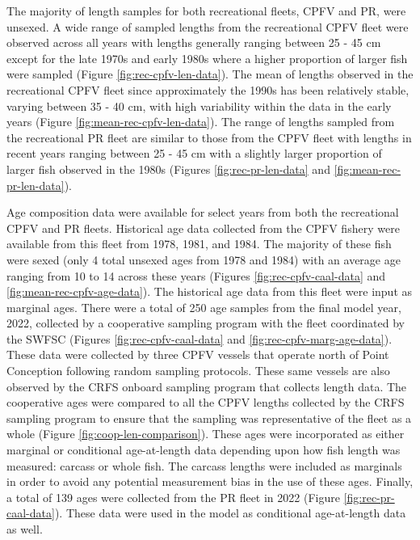\documentclass[11pt,
  english,
  letterpaper,
]{article}
\begin{document}
The majority of length samples for both recreational fleets, CPFV and PR, were unsexed. A wide range of sampled lengths from the recreational CPFV fleet were observed across all years with lengths generally ranging between 25 - 45 cm except for the late 1970s and early 1980s where a higher proportion of larger fish were sampled (Figure \ref{fig:rec-cpfv-len-data}). The mean of lengths observed in the recreational CPFV fleet since approximately the 1990s has been relatively stable, varying between 35 - 40 cm, with high variability within the data in the early years (Figure \ref{fig:mean-rec-cpfv-len-data}). The range of lengths sampled from the recreational PR fleet are similar to those from the CPFV fleet with lengths in recent years ranging between 25 - 45 cm with a slightly larger proportion of larger fish observed in the 1980s (Figures \ref{fig:rec-pr-len-data} and \ref{fig:mean-rec-pr-len-data}).

Age composition data were available for select years from both the recreational CPFV and PR fleets. Historical age data collected from the CPFV fishery were available from this fleet from 1978, 1981, and 1984. The majority of these fish were sexed (only 4 total unsexed ages from 1978 and 1984) with an average age ranging from 10 to 14 across these years (Figures \ref{fig:rec-cpfv-caal-data} and \ref{fig:mean-rec-cpfv-age-data}). The historical age data from this fleet were input as marginal ages. There were a total of 250 age samples from the final model year, 2022, collected by a cooperative sampling program with the fleet coordinated by the SWFSC (Figures \ref{fig:rec-cpfv-caal-data} and \ref{fig:rec-cpfv-marg-age-data}). These data were collected by three CPFV vessels that operate north of Point Conception following random sampling protocols. These same vessels are also observed by the CRFS onboard sampling program that collects length data. The cooperative ages were compared to all the CPFV lengths collected by the CRFS sampling program to ensure that the sampling was representative of the fleet as a whole (Figure \ref{fig:coop-len-comparison}). These ages were incorporated as either marginal or conditional age-at-length data depending upon how fish length was measured: carcass or whole fish. The carcass lengths were included as marginals in order to avoid any potential measurement bias in the use of these ages. Finally, a total of 139 ages were collected from the PR fleet in 2022 (Figure \ref{fig:rec-pr-caal-data}). These data were used in the model as conditional age-at-length data as well.
\end{document}
